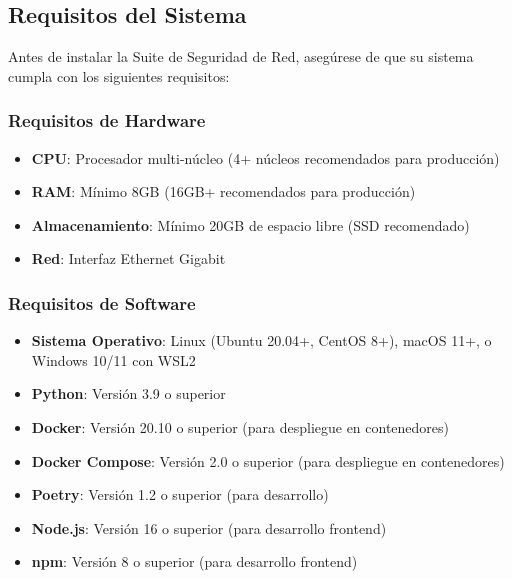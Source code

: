 \subsection{Requisitos del Sistema}
Antes de instalar la Suite de Seguridad de Red, asegúrese de que su sistema cumpla con los siguientes requisitos:

\subsubsection{Requisitos de Hardware}
\begin{itemize}
    \item \textbf{CPU}: Procesador multi-núcleo (4+ núcleos recomendados para producción)
    \item \textbf{RAM}: Mínimo 8GB (16GB+ recomendados para producción)
    \item \textbf{Almacenamiento}: Mínimo 20GB de espacio libre (SSD recomendado)
    \item \textbf{Red}: Interfaz Ethernet Gigabit
\end{itemize}

\subsubsection{Requisitos de Software}
\begin{itemize}
    \item \textbf{Sistema Operativo}: Linux (Ubuntu 20.04+, CentOS 8+), macOS 11+, o Windows 10/11 con WSL2
    \item \textbf{Python}: Versión 3.9 o superior
    \item \textbf{Docker}: Versión 20.10 o superior (para despliegue en contenedores)
    \item \textbf{Docker Compose}: Versión 2.0 o superior (para despliegue en contenedores)
    \item \textbf{Poetry}: Versión 1.2 o superior (para desarrollo)
    \item \textbf{Node.js}: Versión 16 o superior (para desarrollo frontend)
    \item \textbf{npm}: Versión 8 o superior (para desarrollo frontend)
\end{itemize}


